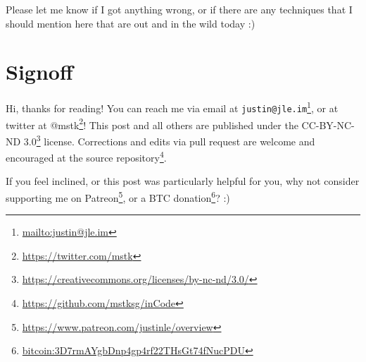\documentclass[]{article}
\renewcommand{\href}[2]{#2\footnote{\url{#1}}}
\begin{document}
Please let me know if I got anything wrong, or if there are any techniques that
I should mention here that are out and in the wild today :)

\hypertarget{signoff}{%
\section{Signoff}\label{signoff}}

Hi, thanks for reading! You can reach me via email at
\href{mailto:justin@jle.im}{\nolinkurl{justin@jle.im}}, or at twitter at
\href{https://twitter.com/mstk}{@mstk}! This post and all others are published
under the \href{https://creativecommons.org/licenses/by-nc-nd/3.0/}{CC-BY-NC-ND
3.0} license. Corrections and edits via pull request are welcome and encouraged
at \href{https://github.com/mstksg/inCode}{the source repository}.

If you feel inclined, or this post was particularly helpful for you, why not
consider \href{https://www.patreon.com/justinle/overview}{supporting me on
Patreon}, or a \href{bitcoin:3D7rmAYgbDnp4gp4rf22THsGt74fNucPDU}{BTC donation}?
:)
\end{document}
